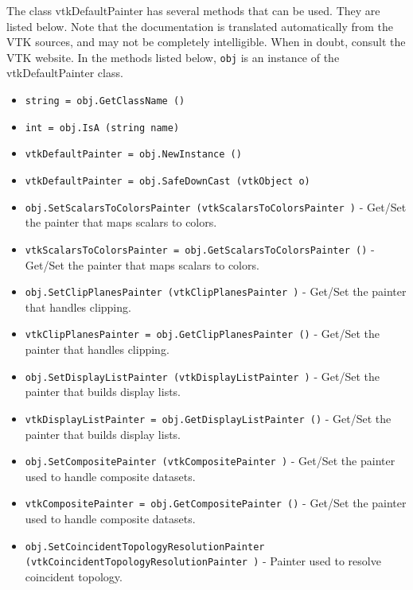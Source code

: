 The class vtkDefaultPainter has several methods that can be used.
  They are listed below.
Note that the documentation is translated automatically from the VTK sources,
and may not be completely intelligible.  When in doubt, consult the VTK website.
In the methods listed below, \verb|obj| is an instance of the vtkDefaultPainter class.
\begin{itemize}
\item  \verb|string = obj.GetClassName ()|

\item  \verb|int = obj.IsA (string name)|

\item  \verb|vtkDefaultPainter = obj.NewInstance ()|

\item  \verb|vtkDefaultPainter = obj.SafeDownCast (vtkObject o)|

\item  \verb|obj.SetScalarsToColorsPainter (vtkScalarsToColorsPainter )| -  Get/Set the painter that maps scalars to colors.

\item  \verb|vtkScalarsToColorsPainter = obj.GetScalarsToColorsPainter ()| -  Get/Set the painter that maps scalars to colors.

\item  \verb|obj.SetClipPlanesPainter (vtkClipPlanesPainter )| -  Get/Set the painter that handles clipping.

\item  \verb|vtkClipPlanesPainter = obj.GetClipPlanesPainter ()| -  Get/Set the painter that handles clipping.

\item  \verb|obj.SetDisplayListPainter (vtkDisplayListPainter )| -  Get/Set the painter that builds display lists.

\item  \verb|vtkDisplayListPainter = obj.GetDisplayListPainter ()| -  Get/Set the painter that builds display lists.

\item  \verb|obj.SetCompositePainter (vtkCompositePainter )| -  Get/Set the painter used to handle composite datasets.

\item  \verb|vtkCompositePainter = obj.GetCompositePainter ()| -  Get/Set the painter used to handle composite datasets.

\item  \verb|obj.SetCoincidentTopologyResolutionPainter (vtkCoincidentTopologyResolutionPainter )| -  Painter used to resolve coincident topology.


\end{itemize}
